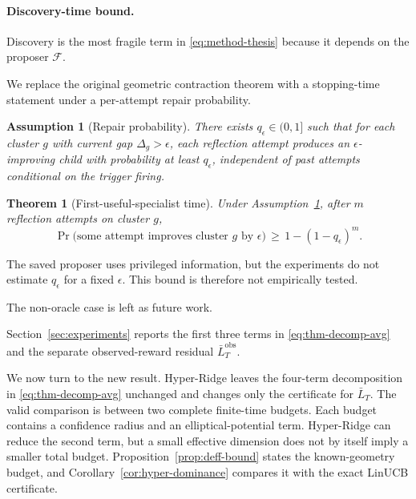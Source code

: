 \documentclass{article} %
\newtheorem{theorem}{Theorem}
\newtheorem{assumption}{Assumption}
\begin{document}
\paragraph{Discovery-time bound.}

\label{sec:method-specialist}

Discovery is the most fragile term in \eqref{eq:method-thesis} because it depends on the proposer $\mathcal{F}$.

We replace the original geometric contraction theorem with a stopping-time statement under a per-attempt repair probability.

\begin{assumption}[Repair probability]
\label{ass:repair}
There exists $q_\epsilon \in (0,1]$ such that for each cluster $g$ with current gap $\Delta_g > \epsilon$, each reflection attempt produces an $\epsilon$-improving child with probability at least $q_\epsilon$, independent of past attempts conditional on the trigger firing.
\end{assumption}

\begin{theorem}[First-useful-specialist time]
\label{thm:specialist}
Under Assumption~\ref{ass:repair}, after $m$ reflection attempts on cluster $g$,
\begin{equation}
\label{eq:thm-specialist}
\Pr\bigl(\text{some attempt improves cluster } g \text{ by } \epsilon\bigr) \,\ge\, 1 - (1 - q_\epsilon)^m.
\end{equation}
\end{theorem}

The saved proposer uses privileged information, but the experiments do not
estimate \(q_\epsilon\) for a fixed \(\epsilon\). This bound is therefore not
empirically tested.

The non-oracle case is left as future work.

Section~\ref{sec:experiments} reports the first three terms in
\eqref{eq:thm-decomp-avg} and the separate observed-reward residual
\(\bar L_T^{\mathrm{obs}}\).

\label{sec:theory}

We now turn to the new result. Hyper-Ridge leaves the four-term decomposition
in \eqref{eq:thm-decomp-avg} unchanged and changes only the certificate for
$\bar L_T$. The valid
comparison is between two complete finite-time budgets. Each budget contains a
confidence radius and an elliptical-potential term. Hyper-Ridge can reduce the
second term, but a small effective dimension does not by itself imply a smaller
total budget. Proposition~\ref{prop:deff-bound} states the known-geometry
budget, and Corollary~\ref{cor:hyper-dominance} compares it with the exact
LinUCB certificate.
\end{document}
